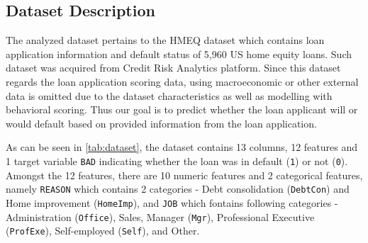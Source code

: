 \subsection{Dataset Description}
The analyzed dataset pertains to the HMEQ dataset which contains loan application information and default status of 5,960 US home equity loans. Such dataset was acquired from Credit Risk Analytics platform. Since this dataset regards the loan application scoring data, using macroeconomic or other external data is omitted due to the dataset characteristics as well as modelling with behavioral scoring.
Thus our goal is to predict whether the loan applicant will or would default based on provided information from the loan application.

As can be seen in \autoref{tab:dataset}, the dataset contains 13 columns, 12 features and 1 target variable \texttt{BAD} indicating whether the loan was in default (\texttt{1}) or not (\texttt{0}). 
Amongst the 12 features, there are 10 numeric features and 2 categorical features, namely \texttt{REASON} which contains 2 categories - Debt consolidation (\texttt{DebtCon}) and Home improvement (\texttt{HomeImp}), and \texttt{JOB} which fontains following categories - Administration (\texttt{Office}), Sales, Manager (\texttt{Mgr}), Professional Executive (\texttt{ProfExe}), Self-employed (\texttt{Self}), and Other.


